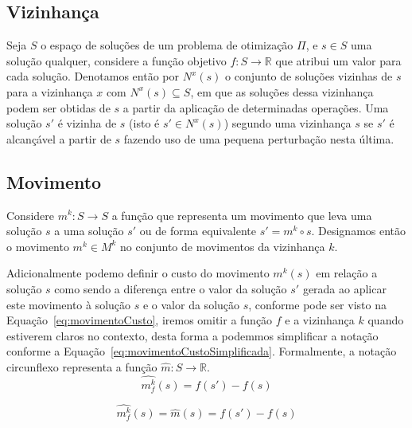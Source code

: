 \subsection{Vizinhança} \label{subsec:vizinhanca}

Seja $S$ o espaço de soluções de um problema de otimização $\Pi$, e $s \in S$ uma solução qualquer, considere a função objetivo $f: S \rightarrow \mathbb{R}$ que atribui um valor para cada solução.
Denotamos então por $N^x(s)$ o conjunto de soluções vizinhas de $s$ para a vizinhança $x$ com $N^x(s) \subseteq S$, em que as soluções dessa vizinhança podem ser obtidas de $s$ a partir da aplicação de determinadas operações.
Uma solução $s'$ é vizinha de $s$ (isto é $s' \in N^x(s)$) segundo uma vizinhança $s$ se $s'$ é alcançável a partir de $s$ fazendo uso de uma pequena perturbação nesta última.

\subsection{Movimento} \label{subsec:movimento}

Considere $m^k: S \rightarrow S$ a função que representa um movimento que leva uma solução $s$ a uma solução $s'$ ou de forma equivalente $s' = m^k \circ s$.
Designamos então o movimento $m^k \in M^k$ no conjunto de movimentos da vizinhança $k$.

Adicionalmente podemo definir o custo do movimento $m^k(s)$ em relação a solução $s$ como sendo a diferença entre o valor da solução $s'$ gerada ao aplicar este movimento à solução $s$ e o valor da solução $s$, conforme pode ser visto na Equação~\ref{eq:movimentoCusto}, iremos omitir a função $f$ e a vizinhança $k$ quando estiverem claros no contexto, desta forma a podemmos simplificar a notação conforme a Equação~\ref{eq:movimentoCustoSimplificada}.
Formalmente, a notação circunflexo representa a função $\widehat{m}: S \rightarrow \mathbb{R}$.
\begin{equation} \label{eq:movimentoCusto}
\widehat{m^k_f}(s) = f(s') - f(s)
\end{equation}

\begin{equation} \label{eq:movimentoCustoSimplificada}
\widehat{m^k_f}(s) = \widehat{m}(s) = f(s') - f(s)
\end{equation}

